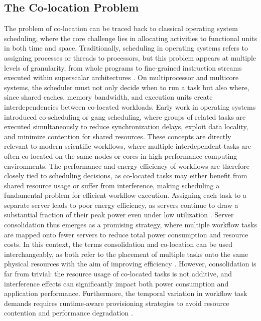 \subsection{The Co-location Problem}
\label{sec:background_colocation}
The problem of co-location can be traced back to classical operating system scheduling, where the core challenge lies in allocating activities to functional units in both time and space. Traditionally, scheduling in operating systems refers to assigning processes or threads to processors, but this problem appears at multiple levels of granularity, from whole programs to fine-grained instruction streams executed within superscalar architectures \cite{5702048}. On multiprocessor and multicore systems, the scheduler must not only decide when to run a task but also where, since shared caches, memory bandwidth, and execution units create interdependencies between co-located workloads. Early work in operating systems introduced co-scheduling or gang scheduling, where groups of related tasks are executed simultaneously to reduce synchronization delays, exploit data locality, and minimize contention for shared resources. These concepts are directly relevant to modern scientific workflows, where multiple interdependent tasks are often co-located on the same nodes or cores in high-performance computing environments. The performance and energy efficiency of workflows are therefore closely tied to scheduling decisions, as co-located tasks may either benefit from shared resource usage or suffer from interference, making scheduling a fundamental problem for efficient workflow execution.
Assigning each task to a separate server leads to poor energy efficiency, as servers continue to draw a substantial fraction of their peak power even under low utilization \cite{6193474} \cite{Kuity_2023}. Server consolidation thus emerges as a promising strategy, where multiple workflow tasks are mapped onto fewer servers to reduce total power consumption and resource costs. In this context, the terms consolidation and co-location can be used interchangeably, as both refer to the placement of multiple tasks onto the same physical resources with the aim of improving efficiency \cite{5644899}. However, consolidation is far from trivial: the resource usage of co-located tasks is not additive, and interference effects can significantly impact both power consumption and application performance. Furthermore, the temporal variation in workflow task demands requires runtime-aware provisioning strategies to avoid resource contention and performance degradation \cite{5644899}.

